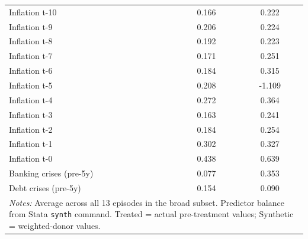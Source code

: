 \begin{tabular}{lcc}
Inflation t-10 & 0.166 & 0.222 \\
Inflation t-9 & 0.206 & 0.224 \\
Inflation t-8 & 0.192 & 0.223 \\
Inflation t-7 & 0.171 & 0.251 \\
Inflation t-6 & 0.184 & 0.315 \\
Inflation t-5 & 0.208 & -1.109 \\
Inflation t-4 & 0.272 & 0.364 \\
Inflation t-3 & 0.163 & 0.241 \\
Inflation t-2 & 0.184 & 0.254 \\
Inflation t-1 & 0.302 & 0.327 \\
Inflation t-0 & 0.438 & 0.639 \\
Banking crises (pre-5y) & 0.077 & 0.353 \\
Debt crises (pre-5y) & 0.154 & 0.090 \\
\hline\hline
\multicolumn{3}{p{10cm}}{\textit{Notes:} Average across all 13 episodes in the broad subset. Predictor balance from Stata \texttt{synth} command. Treated = actual pre-treatment values; Synthetic = weighted-donor values.} \\
\end{tabular}
